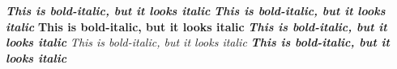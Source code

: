 \documentclass{article}
\begin{document}
\textit {\textbf {This is bold-italic, but it looks italic}}
\textbf{\textit{This is bold-italic, but it looks italic}}
\textbf{\textbf{This is bold-italic, but it looks italic}}
\textbf{\emph{This is bold-italic, but it looks italic}}
\textit{\emph{This is bold-italic, but it looks italic}}
\emph{\textbf{This is bold-italic, but it looks italic}}
\end{document}
